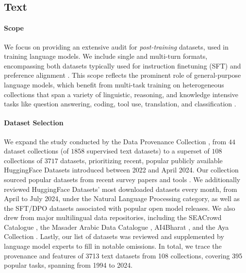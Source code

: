 \subsection{Text}

\vspace{-2mm}
\paragraph{Scope} We focus on providing an extensive audit for
\emph{post-training} datasets, used in training language models. We include single and multi-turn formats, encompassing both datasets typically used for instruction finetuning (SFT) and preference alignment \cite{rafailov2023direct}. This scope reflects the prominent role of general-purpose language models, which benefit from multi-task training on heterogeneous collections that span a variety of linguistic, reasoning, and knowledge intensive tasks like question answering, coding, tool use, translation, and classification \citep{weifinetuned, ouyang2022training}.

\vspace{-2mm}
\paragraph{Dataset Selection}
We expand the study conducted by the Data Provenance Collection \citep{longpre2023data}, from $44$ dataset collections (of $1858$ supervised text datasets) to a superset of $108$ collections of $3717$ datasets, prioritizing recent, popular publicly available HuggingFace Datasets introduced between 2022 and April 2024.
Our collection sourced popular datasets from recent survey papers \citep{albalak2024survey, liu2024datasets} and tools \citep{longpre2024responsible}. We additionally reviewed HuggingFace Datasets' most downloaded datasets every month, from April to July 2024, under the Natural Language Processing category, as well as the SFT/DPO datasets associated with popular open model releases.
We also drew from major multilingual data repositories, including the SEACrowd Catalogue \citep{lovenia2024seacrowd}, the Masader Arabic Data Catalogue \citep{alyafeai2022masader}, AI4Bharat \citep{kunchukuttan2020ai4bharat}, and the Aya Collection \citep{singh2024aya}.
Lastly, our list of datasets was reviewed and supplemented by language model experts to fill in notable omissions.
In total, we trace the provenance and features of 3713 text datasets from 108 collections, covering 395 popular tasks, spanning from 1994 to 2024.

